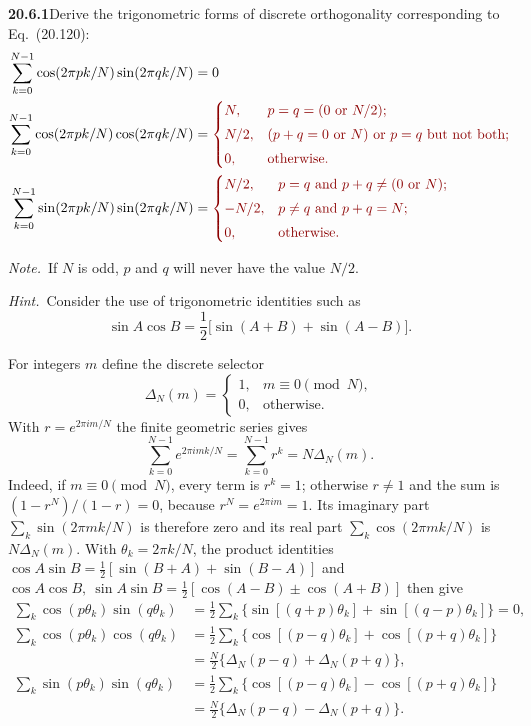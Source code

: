 \par\bigskip
\noindent\textbf{20.6.1}\quad Derive the trigonometric forms of
discrete orthogonality corresponding to Eq.~(20.120):
\begin{align*}
\sum_{k=0}^{N-1}\cos(2\pi pk/N)\sin(2\pi qk/N)&=0\\
\sum_{k=0}^{N-1}\cos(2\pi pk/N)\cos(2\pi qk/N)&=
\erratum{\begin{cases}
N, & p=q=(0\text{ or }N/2);\\[3pt]
N/2, & (p+q=0\text{ or }N)\text{ or }p=q\text{ but not both};\\[3pt]
0, & \text{otherwise}.
\end{cases}}\\
\sum_{k=0}^{N-1}\sin(2\pi pk/N)\sin(2\pi qk/N)&=
\erratum{\begin{cases}
N/2, & p=q\text{ and }p+q\ne(0\text{ or }N);\\[3pt]
-N/2, & p\ne q\text{ and }p+q=N;\\[3pt]
0, & \text{otherwise}.
\end{cases}}
\end{align*}
\par\emph{Note.}~If $N$ is odd, $p$ and $q$ will never have the
value $N/2$.
\par\emph{Hint.}~Consider the use of trigonometric identities
such as
\[
\sin A\cos B=\frac{1}{2}\big[\sin(A+B)+\sin(A-B)\big].
\]
\par{}
\solution
For integers $m$ define the discrete selector
\[
\Delta_N(m)=\begin{cases}1,&m\equiv0\pmod N,\\0,&\text{otherwise}.
\end{cases}
\]
With $r=e^{2\pi im/N}$ the finite geometric series gives
\[
\sum_{k=0}^{N-1}e^{2\pi imk/N}=\sum_{k=0}^{N-1}r^k=N\Delta_N(m).
\]
Indeed, if $m\equiv0\pmod N$, every term is $r^k=1$; otherwise $r\ne1$
and the sum is $(1-r^N)/(1-r)=0$, because
$r^N=e^{2\pi im}=1$. Its imaginary part
$\sum_k\sin(2\pi mk/N)$ is therefore zero and its real part
$\sum_k\cos(2\pi mk/N)$ is $N\Delta_N(m)$. With
$\theta_k=2\pi k/N$, the product identities
$\cos A\sin B=\frac12[\sin(B+A)+\sin(B-A)]$ and
$\cos A\cos B,\ \sin A\sin B=\frac12[\cos(A-B)\pm\cos(A+B)]$
then give
\begin{align*}
\sum_k\cos(p\theta_k)\sin(q\theta_k)
&=\frac12\sum_k\{\sin[(q+p)\theta_k]+\sin[(q-p)\theta_k]\}=0,\\
\sum_k\cos(p\theta_k)\cos(q\theta_k)
&=\frac12\sum_k\{\cos[(p-q)\theta_k]+\cos[(p+q)\theta_k]\}\\
&=\frac N2\{\Delta_N(p-q)+\Delta_N(p+q)\},\\
\sum_k\sin(p\theta_k)\sin(q\theta_k)
&=\frac12\sum_k\{\cos[(p-q)\theta_k]-\cos[(p+q)\theta_k]\}\\
&=\frac N2\{\Delta_N(p-q)-\Delta_N(p+q)\}.
\end{align*}
